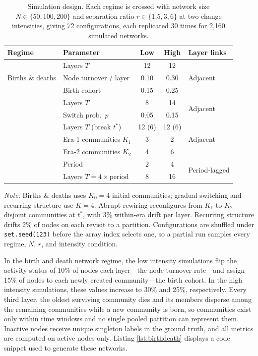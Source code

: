 \documentclass[11pt, letterpaper]{article}
\numberwithin{equation}{section}
\begin{document}
\begin{table}[ht]\centering
\caption{Simulation design. Each regime is crossed with network size
$N \in \{50, 100, 200\}$ and separation ratio $r \in \{1.5, 3, 6\}$ at two
change intensities, giving 72 configurations, each replicated 30 times for
2,160 simulated networks.}
\label{tab:app_simgrid}
\begin{tabular}{llccl}
\toprule
Regime & Parameter & Low & High & Layer links \\
\midrule
\multirow{3}{*}{Births \& deaths}
  & Layers $T$              & 12   & 12   & \multirow{3}{*}{Adjacent} \\
  & Node turnover / layer   & 0.10 & 0.30 & \\
  & Birth cohort            & 0.15 & 0.25 & \\
\addlinespace
\multirow{2}{*}{Gradual switching}
  & Layers $T$              & 8    & 14   & \multirow{2}{*}{Adjacent} \\
  & Switch prob.\ $p$       & 0.05 & 0.15 & \\
\addlinespace
\multirow{3}{*}{Abrupt rewiring}
  & Layers $T$ (break $t^*$)& 12 (6) & 12 (6) & \multirow{3}{*}{Adjacent} \\
  & Era-1 communities $K_1$ & 3    & 2    & \\
  & Era-2 communities $K_2$ & 4    & 6    & \\
\addlinespace
\multirow{2}{*}{Recurring structure}
  & Period                  & 2    & 4    & \multirow{2}{*}{Period-lagged} \\
  & Layers $T = 4\times$period & 8 & 16   & \\
\bottomrule
\end{tabular}

\vspace{0.5em}
\begin{minipage}{0.92\textwidth}
\footnotesize \textit{Note:} Births \& deaths uses $K_0 = 4$ initial
communities; gradual switching and recurring structure use $K = 4$. Abrupt
rewiring reconfigures from $K_1$ to $K_2$ disjoint communities at $t^*$, with
3\% within-era drift per layer. Recurring structure drifts 2\% of nodes on
each revisit to a partition. Configurations are shuffled under
\texttt{set.seed(123)} before the array index selects one, so a partial run
samples every regime, $N$, $r$, and intensity condition.
\end{minipage}
\end{table}

In the birth and death network regime, the low intensity simulations flip the activity status of 10\% of nodes each layer---the node turnover rate---and assign 15\% of nodes to each newly created community---the birth cohort. In the high intensity simulations, these values increase to 30\% and 25\%, respectively. Every third layer, the oldest surviving community dies and its members disperse among the remaining communities while a new community is born, so communities exist only within time windows and no single pooled partition can represent them. Inactive nodes receive unique singleton labels in the ground truth, and all metrics are computed on active nodes only. Listing \ref{lst:birthdeath} displays a code snippet used to generate these networks.
\end{document}

